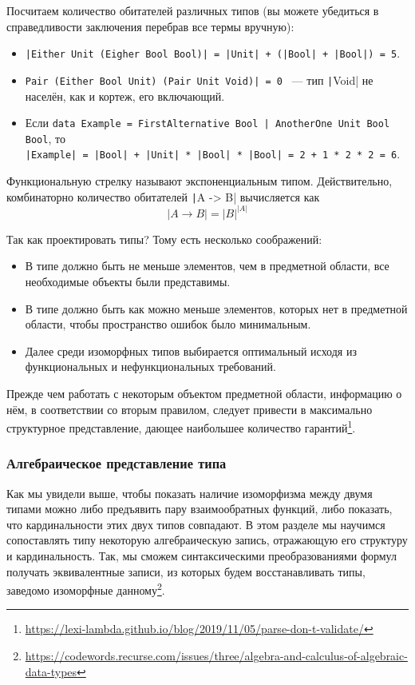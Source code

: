 Посчитаем количество обитателей различных типов (вы можете убедиться в справедливости заключения перебрав все термы вручную):
\begin{itemize}
    \item \texttt{|Either Unit (Eigher Bool Bool)| = |Unit| + (|Bool| + |Bool|) = 5}.
    \item \texttt{Pair (Either Bool Unit) (Pair Unit Void)| = 0} ~--- тип \texttt|Void| не населён, как и кортеж, его включающий.
    \item Если \texttt{data Example = FirstAlternative Bool | AnotherOne Unit Bool Bool}, то \\\texttt{|Example| = |Bool| + |Unit| * |Bool| * |Bool| = 2 + 1 * 2 * 2 = 6}.
\end{itemize}

Функциональную стрелку называют экспоненциальным типом.
Действительно, комбинаторно количество обитателей \texttt|A -> B| вычисляется как \[|A \to B| = |B|^{|A|}\]

Так как проектировать типы?
Тому есть несколько соображений:
\begin{itemize}
    \item В типе должно быть не меньше элементов, чем в предметной области, все необходимые объекты были представимы.
    \item В типе должно быть как можно меньше элементов, которых нет в предметной области, чтобы пространство ошибок было минимальным.
    \item Далее среди изоморфных типов выбирается оптимальный исходя из функциональных и нефункциональных требований.
\end{itemize}

Прежде чем работать с некоторым объектом предметной области, информацию о нём, в соответствии со вторым правилом, следует привести в максимально структурное представление, дающее наибольшее количество гарантий\footnote{\url{https://lexi-lambda.github.io/blog/2019/11/05/parse-don-t-validate/}}.

\subsubsection{Алгебраическое представление типа} \label{subsubsec:type-algebra}

Как мы увидели выше, чтобы показать наличие изоморфизма между двумя типами можно либо предъявить пару взаимообратных функций, либо показать, что кардинальности этих двух типов совпадают.
В этом разделе мы научимся сопоставлять типу некоторую алгебраическую запись, отражающую его структуру и кардинальность.
Так, мы сможем синтаксическими преобразованиями формул получать эквивалентные записи, из которых будем восстанавливать типы, заведомо изоморфные данному\footnote{\url{https://codewords.recurse.com/issues/three/algebra-and-calculus-of-algebraic-data-types}}.


